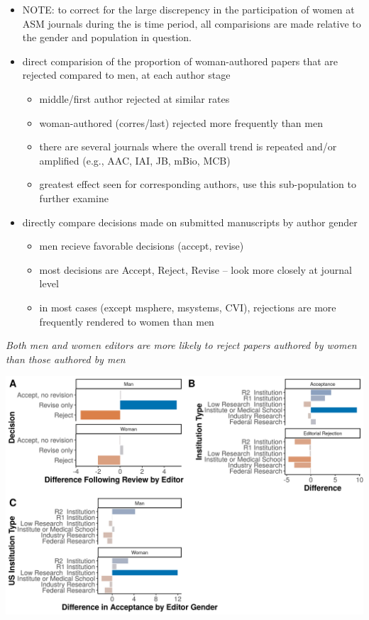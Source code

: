 \documentclass[11pt,]{article}
\providecommand{\tightlist}{%
  \setlength{\itemsep}{0pt}\setlength{\parskip}{0pt}}
\begin{document}
\begin{itemize}
\tightlist
\item
  NOTE: to correct for the large discrepency in the participation of
  women at ASM journals during the is time period, all comparisions are
  made relative to the gender and population in question.
\item
  direct comparision of the proportion of woman-authored papers that are
  rejected compared to men, at each author stage

  \begin{itemize}
  \tightlist
  \item
    middle/first author rejected at similar rates
  \item
    woman-authored (corres/last) rejected more frequently than men
  \item
    there are several journals where the overall trend is repeated
    and/or amplified (e.g., AAC, IAI, JB, mBio, MCB)
  \item
    greatest effect seen for corresponding authors, use this
    sub-population to further examine
  \end{itemize}
\item
  directly compare decisions made on submitted manuscripts by author
  gender

  \begin{itemize}
  \tightlist
  \item
    men recieve favorable decisions (accept, revise)
  \item
    most decisions are Accept, Reject, Revise -- look more closely at
    journal level
  \item
    in most cases (except msphere, msystems, CVI), rejections are more
    frequently rendered to women than men
  \end{itemize}
\end{itemize}

\emph{Both men and women editors are more likely to reject papers
authored by women than those authored by men}

\includegraphics{Figure_7.png}
\end{document}

